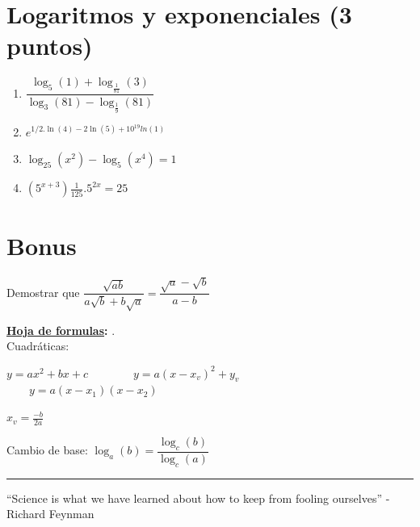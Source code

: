 \documentclass[a4paper,11pt,spanish,sans]{exam}
\begin{document}
\section{Logaritmos y exponenciales (3 puntos)}
	\begin{enumerate}
		
		\item$ \dfrac{\log_5(1)+\log_{\frac{1}{81}}(3)}{\log_3(81)-\log_{\frac{1}{9}}(81)}$
		\item $e^{1/2.\ln(4)-2\ln(5)+10^{19}ln(1)}$
		\item $\log_{25}(x^2)-\log_5(x^4)=1$
		\item $(5^{x+3})\frac{1}{125}.5^{2x}=25 $
	\end{enumerate}
	
\section{Bonus}
	Demostrar que 
	$\dfrac{\sqrt{ab}}{a\sqrt{b}+b\sqrt{a}}=\dfrac{\sqrt{a}-\sqrt{b}}{a-b}$
	
	
	\textbf{\underline{Hoja de formulas}:} . \\
	
	Cuadráticas:
	
	$y=ax^2+bx+c \qquad $$\qquad y=a(x-x_v)^2+y_v \qquad$		$\qquad y=a(x-x_1)(x-x_2)$
	
	$x_v=\frac{-b}{2a}$
	
	Cambio de base: $\log_a(b)=\dfrac{\log_c(b)}{\log_c(a)}$
	
	\rule[2ex]{\textwidth}{1pt}
	
	“Science is what we have learned about how to keep from fooling ourselves”   -Richard Feynman 
\end{document}
